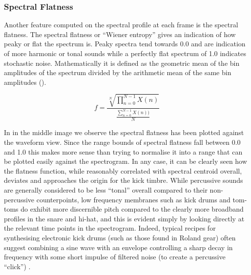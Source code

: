 {{\subsubsection{Spectral Flatness}

Another feature computed on the spectral profile at each frame is the spectral flatness. The spectral flatness or ``Wiener entropy'' gives an indication of how peaky or flat the spectrum is. Peaky spectra tend towards 0.0 and are indication of more harmonic or tonal sounds while a perfectly flat spectrum of 1.0 indicates stochastic noise. Mathematically it is defined as the geometric mean of the bin amplitudes of the spectrum divided by the arithmetic mean of the same bin amplitudes (). 

\begin{equation}
\label{eq:flatness}	
f=\frac{\sqrt[N]{\prod_{n=0}^{N-1}X(n)}}{\frac{\sum_{n=0}^{N-1}X(n))}{N}}
\end{equation}

In  in the middle image we observe the spectral flatness has been plotted against the waveform view. Since the range bounds of spectral flatness fall between 0.0 and 1.0 this makes more sense than trying to normalise it into a range that can be plotted easily against the spectrogram. In any case, it can be clearly seen how the flatness function, while reasonably correlated with spectral centroid overall, deviates and approaches the origin for the kick timbre. While percussive sounds are generally considered to be less ``tonal'' overall compared to their non-percussive counterpoints, low frequency membranes such as kick drums and tom-toms do exhibit more discernible pitch compared to the clearly more broadband profiles in the snare and hi-hat, and this is evident simply by looking directly at the relevant time points in the spectrogram. Indeed, typical recipes for synthesising electronic kick drums (such as those found in Roland gear) often suggest combining a sine wave with an envelope controlling a sharp decay in frequency with some short impulse of filtered noise (to create a percussive ``click'') \citep{Risset1999, Reid2002}.

}}
